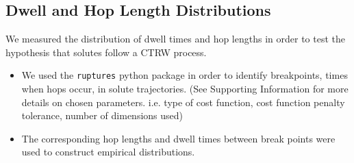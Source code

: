 \documentclass{article}
\begin{document}

  \subsection*{Dwell and Hop Length Distributions}\label{method:hops_and_dwells}

  \noindent We measured the distribution of dwell times and hop lengths in order to test
  the hypothesis that solutes follow a CTRW process.
  \begin{itemize}
	\item We used the \texttt{ruptures} python package in order to identify
	breakpoints, times when hops occur, in solute trajectories.\cite{truong_ruptures:_2018}
	(See Supporting Information for more details on chosen parameters. i.e. type of cost 
	function, cost function penalty	tolerance, number of dimensions used)
	\item The corresponding hop lengths and dwell times between break points were 
	used to construct empirical distributions.
  \end{itemize}
\end{document}
